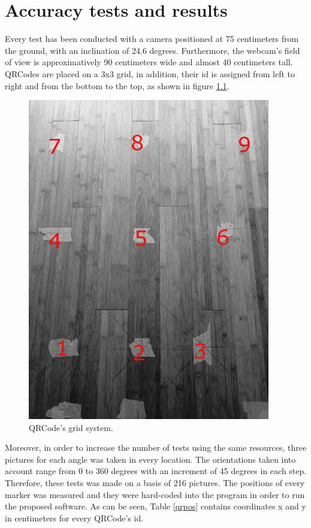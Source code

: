 \chapter{Accuracy tests and results}

Every test has been conducted with a camera positioned at 75 centimeters from the ground, with an inclination of 24.6 degrees. Furthermore, the webcam's field of view is approximatively 90 centimeters wide and almost 40 centimeters tall. QRCodes are placed on a 3x3 grid, in addition, their id is assigned from left to right and from the bottom to the top, as shown in figure \ref{field}.

\begin{figure}[hbt]
    \centering
    \includegraphics[scale=0.5]{img/field.png}
    \caption{QRCode's grid system. \label{field}}
\end{figure}

Moreover, in order to increase the number of tests using the same resources, three pictures for each angle was taken in every location. The orientations taken into account range from 0 to 360 degrees with an increment of 45 degrees in each step. Therefore, these tests was made on a basis of 216 pictures.
\newline
The positions of every marker was measured and they were hard-coded into the program in order to run the proposed software. As can be seen, Table \ref{qrpos} contains coordinates x and y in centimeters for every QRCode's id.

